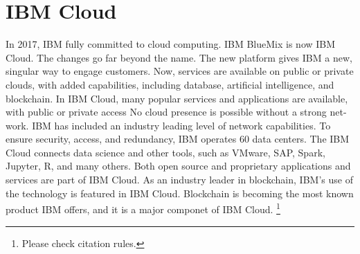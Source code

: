 \section{IBM Cloud}


In 2017, IBM fully committed to cloud computing. IBM BlueMix
is now IBM Cloud. The changes go far beyond the name. The new 
platform gives IBM a new, singular way to engage customers. 
\cite{hid-sp18-525-cloud} Now, services are available on public or 
private clouds, with added capabilities, including database, 
artificial intelligence, and blockchain. \cite{hid-sp18-525-cloud}
In IBM Cloud, many popular services and applications are 
available, with public or private access No cloud presence 
is possible without a strong net- work. IBM has included an 
industry leading level of network capabilities. To ensure 
security, access, and redundancy, IBM operates 60 data centers. 
\cite{hid-sp18-525-cloud}
The IBM Cloud connects data science and other tools, such as 
VMware, SAP, Spark, Jupyter, R, and many others. 
\cite{hid-sp18-525-cloud} Both open source and proprietary 
applications and services are part of IBM Cloud.
As an industry leader in blockchain, IBM’s use of the 
technology is featured in IBM Cloud. Blockchain is becoming 
the most known product IBM offers, and it is a major componet
of IBM Cloud. \cite{hid-sp18-525-cloud}\footnote{Please check citation rules.}
